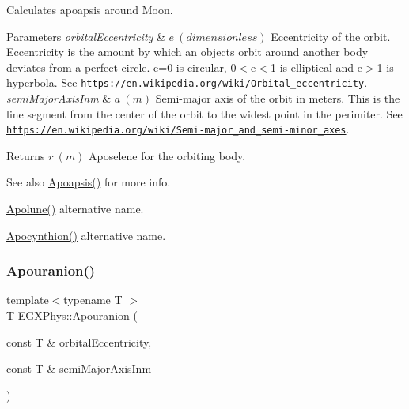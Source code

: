 Calculates apoapsis around Moon. 


\begin{DoxyParams}{Parameters}
{\em orbital\+Eccentricity} & $ e\ (dimensionless)$ Eccentricity of the orbit. Eccentricity is the amount by which an objects orbit around another body deviates from a perfect circle. e=0 is circular, 0$<$e$<$1 is elliptical and e$>$1 is hyperbola. See \href{https://en.wikipedia.org/wiki/Orbital_eccentricity}{\tt https\+://en.\+wikipedia.\+org/wiki/\+Orbital\+\_\+eccentricity}. \\
\hline
{\em semi\+Major\+Axis\+Inm} & $ a\ (m)$ Semi-\/major axis of the orbit in meters. This is the line segment from the center of the orbit to the widest point in the perimiter. See \href{https://en.wikipedia.org/wiki/Semi-major_and_semi-minor_axes}{\tt https\+://en.\+wikipedia.\+org/wiki/\+Semi-\/major\+\_\+and\+\_\+semi-\/minor\+\_\+axes}. \\
\hline
\end{DoxyParams}
\begin{DoxyReturn}{Returns}
$ r\ (m)$ Aposelene for the orbiting body. 
\end{DoxyReturn}
\begin{DoxySeeAlso}{See also}
\mbox{\hyperlink{group___e_g_x_phys-_apoapsis_gafd08a2d1d64886e7bb9bcb7ff65bc3ea}{Apoapsis()}} for more info. 

\mbox{\hyperlink{group___e_g_x_phys-_apoapsis_gac82e5aebcf63e5113ddefe648f40ef2e}{Apolune()}} alternative name. 

\mbox{\hyperlink{group___e_g_x_phys-_apoapsis_ga44b6d3e3280b5a59e1cfb53b65673075}{Apocynthion()}} alternative name. 
\end{DoxySeeAlso}
\mbox{\label{group___e_g_x_phys-_apoapsis_gae6f96c6d840188839132e0ef94ce0711}} 
\subsubsection{\texorpdfstring{Apouranion()}{Apouranion()}}
{\footnotesize\ttfamily template$<$typename T $>$ \\
T E\+G\+X\+Phys\+::\+Apouranion (\begin{DoxyParamCaption}\item[{const T \&}]{orbital\+Eccentricity,  }\item[{const T \&}]{semi\+Major\+Axis\+Inm }\end{DoxyParamCaption})}



